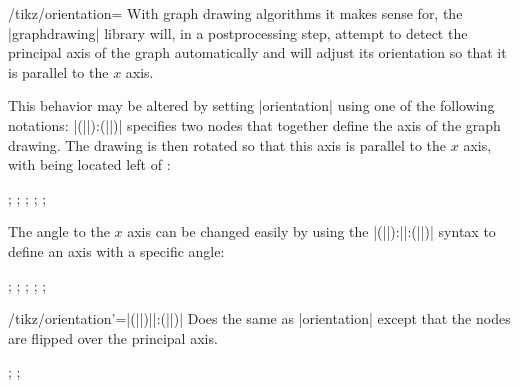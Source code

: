 \begin{key}{/tikz/orientation=}
  With graph drawing algorithms it makes sense for, the |graphdrawing|
  library will, in a postprocessing step, attempt to detect the 
  principal axis of the graph automatically and will adjust its 
  orientation so that it is parallel to the $x$ axis.

  This behavior may be altered by setting |orientation| using one of
  the following notations:
  |(||):(||)| specifies
  two nodes that together define the axis of the graph drawing. The
  drawing is then rotated so that this axis is parallel to the $x$
  axis, with  being located left of :
  \begin{codeexample}[]
\tikz {};
\tikz {};
\tikz {};
\tikz {};
\tikz {};
  \end{codeexample}
  The angle to the $x$ axis can be changed easily by using the
  |(||):||:(||)|
  syntax to define an axis with a specific angle:
  \begin{codeexample}[]
\tikz {};
\tikz {};
\tikz {};
\tikz {};
\tikz {};
  \end{codeexample}
\end{key}

\begin{key}{/tikz/orientation'=|(||)||:(||)|}
  Does the same as |orientation| except that the nodes are flipped over 
  the principal axis.
  \begin{codeexample}[]
\tikz {};
\tikz {};
  \end{codeexample}
\end{key}

